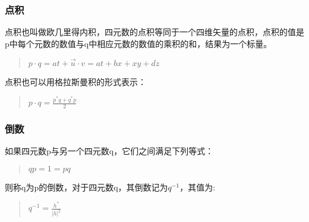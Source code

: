 \documentclass[a4paper,10pt]{article}
\begin{document}
\begin{CJK}{UTF8}{song}
\subsubsection{点积}
点积也叫做欧几里得内积，四元数的点积等同于一个四维矢量的点积，点积的值是p中每个元数的数值与q中相应元数的数值的乘积的和，结果为一个标量。
\begin{quote}
$p\cdot q=at+\vec{u}\cdot{v}=at+bx+xy+dz $
\end{quote}
点积也可以用格拉斯曼积的形式表示：
\begin{quote}
\begin{math}
p\cdot q = \frac{p^{*}q+q^{*}p}{2}
\end{math}
\end{quote}

\subsubsection{倒数}
如果四元数p与另一个四元数q，它们之间满足下列等式：
\begin{quote}
$qp=1=pq$
\end{quote}
则称q为p的倒数，对于四元数q，其倒数记为$q^{-1}$，其值为:
\begin{quote}
$q^{-1}=\frac{h^{*}}{|h|^{2}}$
\end{quote}



























\end{CJK}
\end{document}
